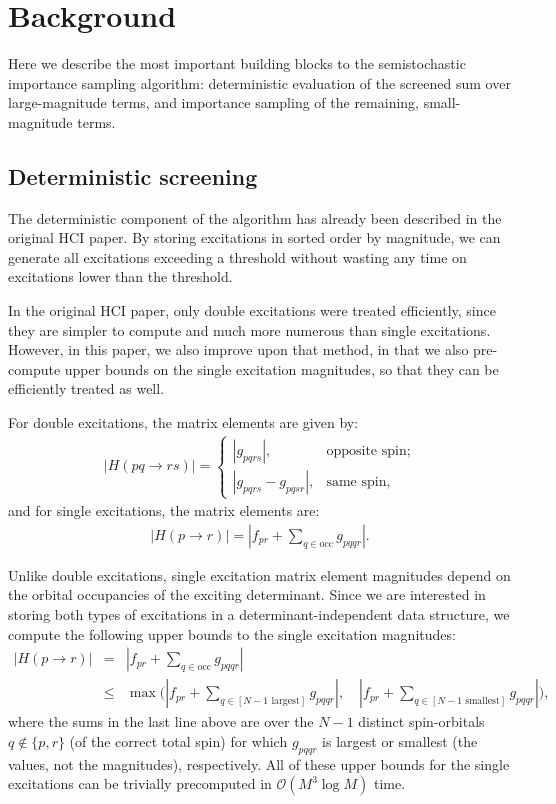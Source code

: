 \documentclass[english]{article}
\begin{document}
\section{Background}
Here we describe the most important building blocks to the semistochastic importance sampling algorithm: deterministic evaluation of the screened sum over large-magnitude terms, and importance sampling of the remaining, small-magnitude terms.

\subsection{Deterministic screening}
The deterministic component of the algorithm has already been described in the original HCI paper. By storing excitations in sorted order by magnitude, we can generate all excitations exceeding a threshold without wasting any time on excitations lower than the threshold.

In the original HCI paper, only double excitations were treated efficiently, since they are simpler to compute and much more numerous than single excitations. However, in this paper, we also improve upon that method, in that we also pre-compute upper bounds on the single excitation magnitudes, so that they can be efficiently treated as well.

For double excitations, the matrix elements are given by:
\begin{eqnarray}
	\left|H(pq\rightarrow rs)\right| = \begin{cases}
		\left|g_{pqrs}\right|, &\textrm{opposite spin};\\
		\left|g_{pqrs} - g_{pqsr}\right|,&\textrm{same spin},
	\end{cases}
\end{eqnarray}
and for single excitations, the matrix elements are:
\begin{eqnarray}
	\left|H(p\rightarrow r)\right| = \left|f_{pr} + \sum_{q\in \textrm{occ}} g_{pqqr}\right|.
\end{eqnarray}

Unlike double excitations, single excitation matrix element magnitudes depend on the orbital occupancies of the exciting determinant. Since we are interested in storing both types of excitations in a determinant-independent data structure, we compute the following upper bounds to the single excitation magnitudes:
\begin{eqnarray}
	\left|H(p\rightarrow r)\right| &=& \left|f_{pr} + \sum_{q\in \textrm{occ}} g_{pqqr}\right|\\
	&\le&\max\Bigg( \left|f_{pr} + \sum_{q\in [N-1 \textrm{ largest}]} g_{pqqr}\right|,
	 \quad \left|f_{pr} + \sum_{q\in [N-1 \textrm{ smallest}]} g_{pqqr}\right|\Bigg),
\end{eqnarray}
where the sums in the last line above are over the $N-1$ distinct spin-orbitals $q\notin\{p,r\}$ (of the correct total spin) for which $g_{pqqr}$ is largest or smallest (the values, not the magnitudes), respectively. All of these upper bounds for the single excitations can be trivially precomputed in $\mathcal{O}(M^3\log M)$ time.
\end{document}
